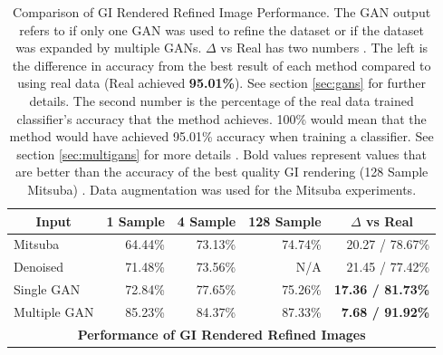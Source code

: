 \begin{table}[]
\centering
\begin{tabular}{|l|r|r|r|r|}
\hline
\multicolumn{1}{|c|}{\textbf{Input}}
& \multicolumn{1}{c|}{\textbf{1 Sample}}
& \multicolumn{1}{c|}{\textbf{4 Sample}}
& \multicolumn{1}{c|}{\textbf{128 Sample}}
& \multicolumn{1}{c|}{\textbf{$\Delta$ vs Real}} \\ \hline
Mitsuba		& 64.44\%	& 73.13\%	& 74.74\%	& 20.27 / 78.67\% \\
Denoised	& 71.48\%	& 73.56\%	& N/A 		& 21.45 / 77.42\%	\\
Single GAN	& 72.84\%	& 77.65\% 	& 75.26\%	& \textbf{17.36 / 81.73\%}	\\
Multiple GAN& 85.23\%	& 84.37\% 	& 87.33\% 	& \textbf{7.68 / 91.92\%}		\\ \hline
\multicolumn{5}{|c|}{\textbf{Performance of GI Rendered Refined Images}}	\\ \hline
\end{tabular}
\caption{Comparison of GI Rendered Refined Image Performance. The GAN output refers to if only one GAN was used to refine the dataset or if the dataset was expanded by multiple GANs. $\Delta$  vs Real has two numbers . The left is the difference in accuracy from the best result of each method compared to using real data (Real achieved \textbf{95.01\%}). See section \ref{sec:gans} for further details.  The second number is the percentage of the real data trained classifier's accuracy that the method achieves.  100\% would mean that the method would have achieved 95.01\% accuracy when training a classifier. See section \ref{sec:multigans} for more details . Bold values represent values that are better than the accuracy of the best quality GI rendering (128 Sample Mitsuba) . Data augmentation was used for the Mitsuba experiments. }
\label{tblallrefined}
\end{table}

